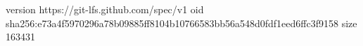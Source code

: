 version https://git-lfs.github.com/spec/v1
oid sha256:e73a4f5970296a78b09885ff8104b10766583bb56a548d0fdf1eed6ffc3f9158
size 163431
